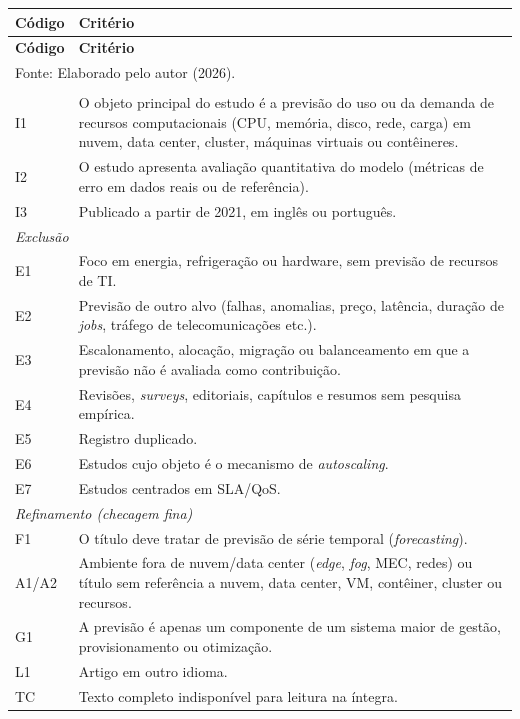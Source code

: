 {\footnotesize
\setlength{\tabcolsep}{4pt}
\renewcommand{\arraystretch}{1.2}
\begin{longtable}{p{1.1cm}p{14.2cm}}
\toprule
\textbf{Código} & \textbf{Critério} \\
\midrule
\endfirsthead
\toprule
\textbf{Código} & \textbf{Critério} \\
\midrule
\endhead
\bottomrule
\multicolumn{2}{l}{Fonte: Elaborado pelo autor (2026).}\\
\endlastfoot
\multicolumn{2}{l}{\textit{Inclusão}}\\
I1 & O objeto principal do estudo é a previsão do uso ou da demanda de recursos computacionais (CPU, memória, disco, rede, carga) em nuvem, data center, cluster, máquinas virtuais ou contêineres. \\
I2 & O estudo apresenta avaliação quantitativa do modelo (métricas de erro em dados reais ou de referência). \\
I3 & Publicado a partir de 2021, em inglês ou português. \\
\midrule
\multicolumn{2}{l}{\textit{Exclusão}}\\
E1 & Foco em energia, refrigeração ou hardware, sem previsão de recursos de TI. \\
E2 & Previsão de outro alvo (falhas, anomalias, preço, latência, duração de \textit{jobs}, tráfego de telecomunicações etc.). \\
E3 & Escalonamento, alocação, migração ou balanceamento em que a previsão não é avaliada como contribuição. \\
E4 & Revisões, \textit{surveys}, editoriais, capítulos e resumos sem pesquisa empírica. \\
E5 & Registro duplicado. \\
E6 & Estudos cujo objeto é o mecanismo de \textit{autoscaling}. \\
E7 & Estudos centrados em SLA/QoS. \\
\midrule
\multicolumn{2}{l}{\textit{Refinamento (checagem fina)}}\\
F1 & O título deve tratar de previsão de série temporal (\textit{forecasting}). \\
A1/A2 & Ambiente fora de nuvem/data center (\textit{edge}, \textit{fog}, MEC, redes) ou título sem referência a nuvem, data center, VM, contêiner, cluster ou recursos. \\
G1 & A previsão é apenas um componente de um sistema maior de gestão, provisionamento ou otimização. \\
L1 & Artigo em outro idioma. \\
TC & Texto completo indisponível para leitura na íntegra. \\
\end{longtable}
}

